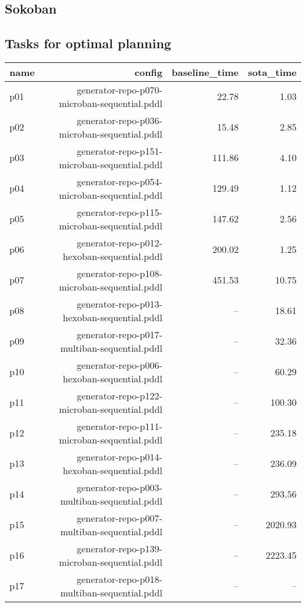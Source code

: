 \documentclass{article}
\begin{document}
                \newpage \subsection{Sokoban}
                    \subsection*{Tasks for optimal planning}
                    
                            \begin{center}
                            \scriptsize
                            \begin{tabular}{@{}l|r|r|r@{}}
                            name & config & baseline\_time & sota\_time\\\midrule
                              p01& generator-repo-p070-microban-sequential.pddl&22.78&1.03\\
  p02& generator-repo-p036-microban-sequential.pddl&15.48&2.85\\
  p03& generator-repo-p151-microban-sequential.pddl&111.86&4.10\\
  p04& generator-repo-p054-microban-sequential.pddl&129.49&1.12\\
  p05& generator-repo-p115-microban-sequential.pddl&147.62&2.56\\
  p06& generator-repo-p012-hexoban-sequential.pddl&200.02&1.25\\
  p07& generator-repo-p108-microban-sequential.pddl&451.53&10.75\\
  p08& generator-repo-p013-hexoban-sequential.pddl&--&18.61\\
  p09& generator-repo-p017-multiban-sequential.pddl&--&32.36\\
  p10& generator-repo-p006-hexoban-sequential.pddl&--&60.29\\
  p11& generator-repo-p122-microban-sequential.pddl&--&100.30\\
  p12& generator-repo-p111-microban-sequential.pddl&--&235.18\\
  p13& generator-repo-p014-hexoban-sequential.pddl&--&236.09\\
  p14& generator-repo-p003-multiban-sequential.pddl&--&293.56\\
  p15& generator-repo-p007-multiban-sequential.pddl&--&2020.93\\
  p16& generator-repo-p139-microban-sequential.pddl&--&2223.45\\
  p17& generator-repo-p018-multiban-sequential.pddl&--&--\\

\end{tabular}
\end{center}
\end{document}
